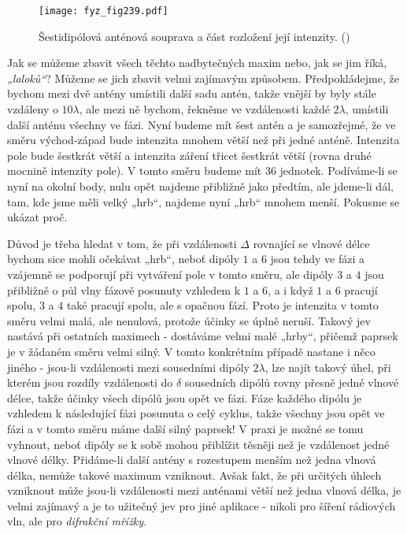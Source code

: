 {   \begin{figure}[ht!] %
      \centering
      \texttt{[image: fyz\_fig239.pdf]}
      \caption{Šestidipólová anténová souprava a část rozložení její intenzity. 
               (\cite[s.~385]{Feynman01})}
      \label{fyz:fig239}
    \end{figure}
    
    Jak se můžeme zbavit všech těchto nadbytečných maxim nebo, jak se jim říká, \emph{„laloků“}? 
    Můžeme se jich zbavit velmi zajímavým způsobem. Předpokládejme, že bychom mezi dvě antény 
    umístili další sadu antén, takže vnější by byly stále vzdáleny o \(10\lambda\), ale mezi ně 
    bychom, řekněme ve vzdálenosti každé \(2\lambda\), umístili další anténu všechny ve fázi. Nyní 
    budeme mít šest antén a je samozřejmé, že ve směru východ-západ bude intenzita mnohem větší než 
    při jedné anténě. Intenzita pole bude šestkrát větší a intenzita záření třicet šestkrát větší 
    (rovna druhé mocnině intenzity pole). V tomto směru budeme mít \(36\) jednotek. Podíváme-li se 
    nyní na okolní body, nulu opět najdeme přibližně jako předtím, ale jdeme-li dál, tam, kde jsme 
    měli velký „hrb“, najdeme nyní „hrb“ mnohem menší. Pokusme se ukázat proč.
    
    Důvod je třeba hledat v tom, že při vzdálenosti \(\Delta\) rovnající se vlnové délce bychom 
    sice mohli očekávat „hrb“, neboť dipóly \(1\) a \(6\) jsou tehdy ve fázi a vzájemně se 
    podporují při vytváření pole v tomto směru, ale dipóly \(3\) a \(4\) jsou přibližně o půl vlny 
    fázově posunuty vzhledem k \(1\) a \(6\), a i když \(1\) a \(6\) pracují spolu, \(3\) a \(4\) 
    také pracují spolu, ale s opačnou fází. Proto je intenzita v tomto směru velmi malá, ale 
    nenulová, protože účinky se úplně neruší. Takový jev nastává při ostatních maximech - dostáváme 
    velmi malé „hrby“, přičemž paprsek je v žádaném směru velmi silný. V tomto konkrétním případě 
    nastane i něco jiného - jsou-li vzdálenosti mezi sousedními dipóly \(2\lambda\), lze najít 
    takový úhel, při kterém jsou rozdíly vzdálenosti do \(\delta\) sousedních dipólů rovny přesně 
    jedné vlnové délce, takže účinky všech dipólů jsou opět ve fázi. Fáze každého dipólu je 
    vzhledem k následující fázi posunuta o celý cyklus, takže všechny jsou opět ve fázi a v tomto 
    směru máme další silný paprsek! V praxi je možné se tomu vyhnout, neboť dipóly se k sobě mohou 
    přiblížit těsněji než je vzdálenost jedné vlnové délky. Přidáme-li další antény s rozestupem 
    menším než jedna vlnová délka, nemůže takové maximum vzniknout. Avšak fakt, že při určitých 
    úhlech vzniknout může jsou-li vzdálenosti mezi anténami větší než jedna vlnová délka, je velmi 
    zajímavý a je to užitečný jev pro jiné aplikace - nikoli pro šíření rádiových vln, ale pro 
    \emph{difrakční mřížky}.
    
}
